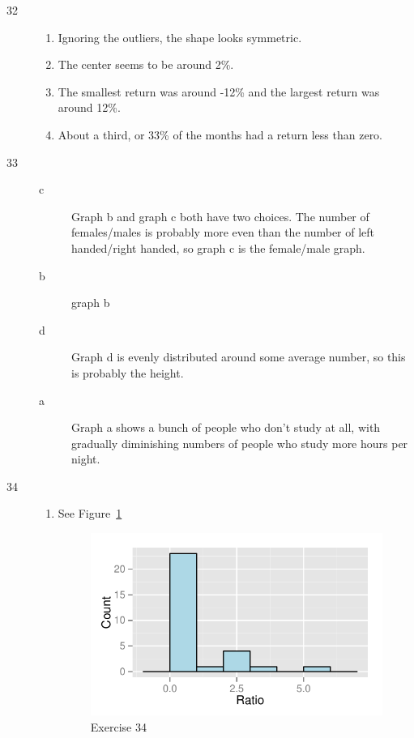 \documentclass[letterpaper, landscape]{exam}
\begin{document}
\begin{description}
      \item[32]
        \begin{enumerate}[{a}]
          \item Ignoring the outliers, the shape looks symmetric.

          \item The center seems to be around 2\%.

          \item The smallest return was around -12\% and the largest return was
          around 12\%.

          \item About a third, or 33\% of the months had a return less than
          zero.
        \end{enumerate}

      \pagebreak

      \item[33]
        \begin{description}
          \item[c] Graph b and graph c both have two choices.  The number of
            females/males is probably more even than the number of left
            handed/right handed, so graph c is the female/male graph.

          \item[b] graph b

          \item[d] Graph d is evenly distributed around some average number, so
            this is probably the height.

          \item[a] Graph a shows a bunch of people who don't study at all, with
            gradually diminishing numbers of people who study more hours per
            night.
        \end{description}

      \item[34]
        \begin{enumerate}[{a}]
          \item See Figure~\ref{fig:ex34}
            \begin{figure}[H]
              \centering
              \includegraphics{figures/ex34.pdf}
              \caption{Exercise 34}\label{fig:ex34}
            \end{figure}


\end{enumerate}
\end{description}
\end{document}
